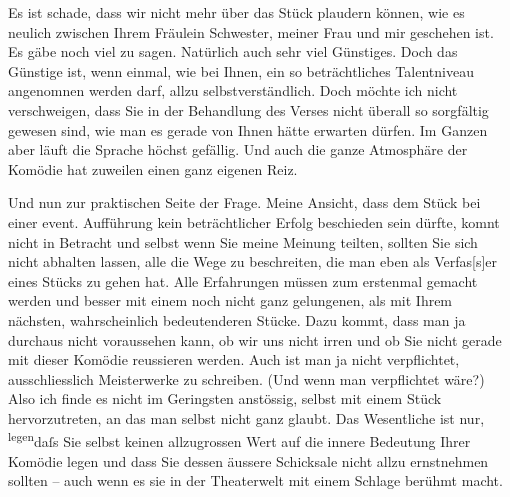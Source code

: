 \pstart
           {\pb}Es ist schade, dass wir nicht mehr über das Stück plaudern können, wie es
               neulich zwischen Ihrem Fräulein Schwester, meiner Frau und mir geschehen ist. Es gäbe noch viel zu sagen. Natürlich auch sehr
               viel Günstiges. Doch das Günstige ist, wenn einmal, wie bei Ihnen, ein so
               beträchtliches Talentniveau angenomnen werden darf, allzu selbstverständlich. Doch
               möchte ich nicht verschweigen, dass Sie in der Behandlung des Verses nicht überall so
               sorgfältig gewesen sind, wie man es gerade von Ihnen hätte erwarten dürfen. Im Ganzen
               aber läuft die Sprache höchst gefällig. Und auch die ganze Atmosphäre der Komödie hat
               zuweilen einen ganz eigenen Reiz.\pend
           
\pstart
           Und nun zur praktischen Seite der Frage. Meine Ansicht, dass dem Stück bei einer event. Aufführung kein
               beträchtlicher Erfolg beschieden sein dürfte, komnt nicht in Betracht und selbst wenn
               Sie meine Meinung teilten, sollten Sie sich nicht abhalten lassen, alle die Wege zu
               beschreiten, die man eben als Verfas{[}s{]}er eines Stücks zu gehen
               hat. Alle Erfahrungen müssen zum {\pb}erstenmal gemacht
               werden und besser mit einem noch nicht ganz gelungenen, als mit Ihrem nächsten,
               wahrscheinlich bedeutenderen Stücke. Dazu kommt, dass man ja durchaus nicht
               voraussehen kann, ob wir uns nicht irren und ob Sie nicht gerade mit dieser Komödie
                  reussieren werden. Auch ist man ja nicht
               verpflichtet, ausschliesslich Meisterwerke zu schreiben. (Und wenn man verpflichtet
               wäre?) Also ich finde es nicht im Geringsten anstössig, selbst mit einem Stück
               hervorzutreten, an das man selbst nicht ganz glaubt. Das Wesentliche ist nur, \substVorne{}\textsuperscript{legen}\substDazwischen{}daſs\substHinten{} Sie selbst keinen allzugrossen Wert auf die innere Bedeutung Ihrer Komödie legen und dass Sie
               dessen äussere Schicksale nicht allzu ernstnehmen sollten – auch wenn es sie in der
               Theaterwelt mit einem Schlage berühmt macht.\pend
           
